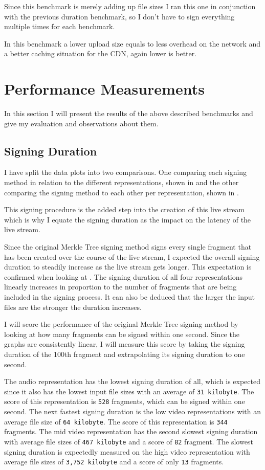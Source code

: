 Since this benchmark is merely adding up file sizes I ran this one in conjunction with the previous duration benchmark, so I don't have to sign everything multiple times for each benchmark.

In this benchmark a lower upload size equals to less overhead on the network and a better caching situation for the CDN, again lower is better.

\section{Performance Measurements\label{sec:performance}}

In this section I will present the results of the above described benchmarks and give my evaluation and observations about them.

\subsection{Signing Duration}

I have split the data plots into two comparisons. One comparing each signing method in relation to the different representations, shown in  and the other comparing the signing method to each other per representation, shown in .

This signing procedure is the added step into the creation of this live stream which is why I equate the signing duration as the impact on the latency of the live stream.

Since the original Merkle Tree signing method signs every single fragment that has been created over the course of the live stream, I expected the overall signing duration to steadily increase as the live stream gets longer. This expectation is confirmed when looking at . The signing duration of all four representations linearly increases in proportion to the number of fragments that are being included in the signing process. It can also be deduced that the larger the input files are the stronger the duration increases. 

I will score the performance of the original Merkle Tree signing method by looking at how many fragments can be signed within one second. Since the graphs are consistently linear, I will measure this score by taking the signing duration of the 100th fragment and extrapolating its signing duration to one second.

The audio representation has the lowest signing duration of all, which is expected since it also has the lowest input file sizes with an average of \texttt{31 kilobyte}. The score of this representation is \texttt{528} fragments, which can be signed within one second. The next fastest signing duration is the low video representations with an average file size of \texttt{64 kilobyte}. The score of this representation is \texttt{344} fragments. The mid video representation has the second slowest signing duration with average file sizes of \texttt{467 kilobyte} and a score of \texttt{82} fragment. The slowest signing duration is expectedly measured on the high video representation with average file sizes of \texttt{3,752 kilobyte} and a score of only \texttt{13} fragments.


